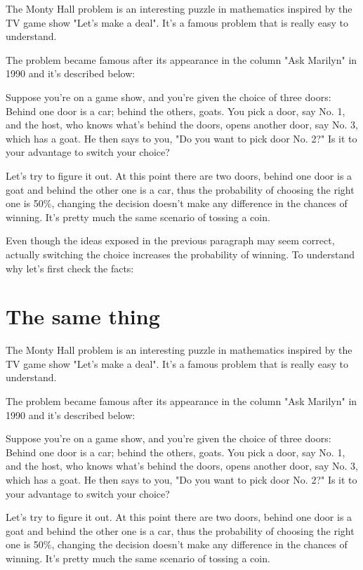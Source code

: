 The Monty Hall problem is an interesting puzzle in mathematics inspired by the TV 
game show "Let's make a deal". It's a famous problem that is really easy to understand.

The problem became famous after its appearance in the column "Ask Marilyn" in 1990 and 
it's described below:

Suppose you're on a game show, and you're given the choice of three doors: Behind one 
door is a car; behind the others, goats. You pick a door, say No. 1, and the host, who 
knows what's behind the doors, opens another door, say No. 3, which has a goat. He then 
says to you, "Do you want to pick door No. 2?" Is it to your advantage to switch your
choice?


Let's try to figure it out. At this point there are two doors, behind one door is a goat 
and behind the other one is a car, thus the probability of choosing the right one is 50\%,
changing the decision doesn't make any difference in the chances of winning. It's pretty
much the same scenario of tossing a coin.

Even though the ideas exposed in the previous paragraph may seem correct, actually 
switching the choice increases the probability of winning. To understand why let's 
first check the facts:

\section{The same thing}

The Monty Hall problem is an interesting puzzle in mathematics inspired by the TV 
game show "Let's make a deal". It's a famous problem that is really easy to understand.

The problem became famous after its appearance in the column "Ask Marilyn" in 1990 and 
it's described below:

Suppose you're on a game show, and you're given the choice of three doors: Behind one 
door is a car; behind the others, goats. You pick a door, say No. 1, and the host, who 
knows what's behind the doors, opens another door, say No. 3, which has a goat. He then 
says to you, "Do you want to pick door No. 2?" Is it to your advantage to switch your
choice?


Let's try to figure it out. At this point there are two doors, behind one door is a goat 
and behind the other one is a car, thus the probability of choosing the right one is 50\%,
changing the decision doesn't make any difference in the chances of winning. It's pretty
much the same scenario of tossing a coin.

